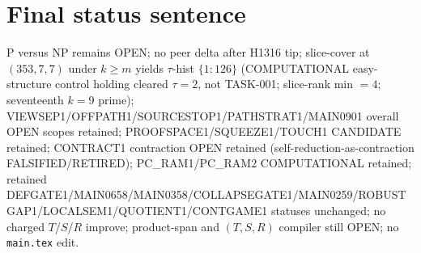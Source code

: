 \documentclass[11pt]{article}
\begin{document}
\section*{Final status sentence}
P versus NP remains OPEN; no peer delta after H1316 tip; slice-cover at $(353,7,7)$ under $k{\ge}m$ yields $\tau$-hist $\{1{:}126\}$ (COMPUTATIONAL easy-structure control holding cleared $\tau{=}2$, not TASK-001; slice-rank min $=4$; seventeenth $k{=}9$ prime); VIEWSEP1/OFFPATH1/SOURCESTOP1/PATHSTRAT1/MAIN0901 overall OPEN scopes retained; PROOFSPACE1/SQUEEZE1/TOUCH1 CANDIDATE retained; CONTRACT1 contraction OPEN retained (self-reduction-as-contraction FALSIFIED/RETIRED); PC\_RAM1/PC\_RAM2 COMPUTATIONAL retained; retained DEFGATE1/MAIN0658/MAIN0358/COLLAPSEGATE1/MAIN0259/ROBUSTGAP1/LOCALSEM1/QUOTIENT1/CONTGAME1 statuses unchanged; no charged $T$/$S$/$R$ improve; product-span and $(T,S,R)$ compiler still OPEN; no \texttt{main.tex} edit.
\end{document}
